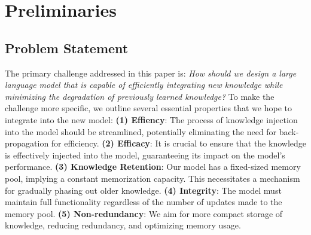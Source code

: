 \section{Preliminaries}
\subsection{Problem Statement}
The primary challenge addressed in this paper is: \emph{How should we design a large language model that is capable of efficiently integrating new knowledge while minimizing the degradation of previously learned knowledge?} 
To make the challenge more specific, we outline several essential properties that we hope to integrate into the new model: \textbf{(1) Effiency}: The process of knowledge injection into the model should be streamlined, potentially eliminating the need for back-propagation for efficiency. \textbf{(2) Efficacy}: It is crucial to ensure that the knowledge is effectively injected into the model, guaranteeing its impact on the model's performance. 
\textbf{(3) Knowledge Retention}: Our model has a fixed-sized memory pool, implying a constant memorization capacity. This necessitates a mechanism for gradually phasing out older knowledge.
\textbf{(4) Integrity}: The model must maintain full functionality regardless of the number of updates made to the memory pool. 
\textbf{(5) Non-redundancy}: We aim for more compact storage of knowledge, reducing redundancy, and optimizing memory usage. 

